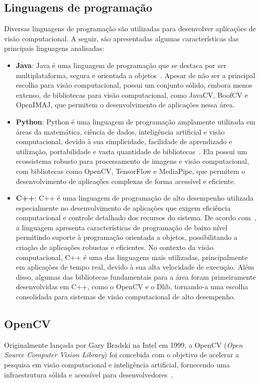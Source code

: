 \subsection{Linguagens de programação}
Diversas linguagens de programação são utilizadas para desenvolver aplicações de visão computacional. A seguir, são apresentadas algumas características das principais linguagens analisadas:
\begin{itemize}
    \item \textbf{Java}: Java é uma linguagem de programação que se destaca por ser multiplataforma, segura e orientada a objetos~\citep{Schildt2019}. Apesar de não ser a principal escolha para visão computacional, possui um conjunto sólido, embora menos extenso, de bibliotecas para visão computacional, como JavaCV, BoofCV e OpenIMAJ, que permitem o desenvolvimento de aplicações nessa área.
    \item \textbf{Python}: Python é uma linguagem de programação amplamente utilizada em áreas da matemática, ciência de dados, inteligência artificial e visão computacional, devido à sua simplicidade, facilidade de aprendizado e utilização, portabilidade e vasta quantidade de bibliotecas~\citep{Lutz1999}. Ela possui um ecossistema robusto para processamento de imagens e visão computacional, com bibliotecas como OpenCV, TensorFlow e MediaPipe, que permitem o desenvolvimento de aplicações complexas de forma acessível e eficiente.
    \item \textbf{C++}: C++ é uma linguagem de programação de alto desempenho utilizada especialmente no desenvolvimento de aplicações que exigem eficiência computacional e controle detalhado dos recursos do sistema. De acordo com~\cite{Meyers2014}, a linguagem apresenta características de programação de baixo nível permitindo suporte à programação orientada a objetos, possibilitando a criação de aplicações robustas e eficientes. No contexto da visão computacional, C++ é uma das linguagens mais utilizadas, principalmente em aplicações de tempo real, devido à sua alta velocidade de execução. Além disso, algumas das bibliotecas fundamentais para a área foram primeiramente desenvolvidas em C++, como o OpenCV e o Dlib, tornando-a uma escolha consolidada para sistemas de visão computacional de alto desempenho.
\end{itemize}

\subsection{OpenCV}
Originalmente lançada por Gary Bradski na Intel em 1999, a OpenCV (\textit{Open Source Computer Vision Library}) foi concebida com o objetivo de acelerar a pesquisa em visão computacional e inteligência artificial, fornecendo uma infraestrutura sólida e acessível para desenvolvedores~\citep{kaehler2017learning}. 

